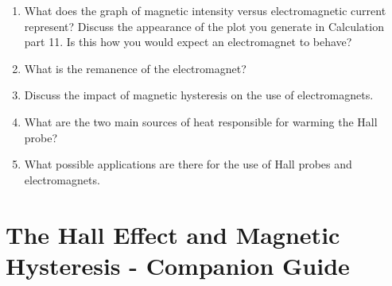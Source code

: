 \begin{enumerate}[resume]
\item What does the graph of magnetic intensity versus electromagnetic current represent? Discuss the appearance of the plot you generate in Calculation part 11. Is this how you would expect an electromagnet to behave?

\item What is the remanence of the electromagnet? 

\item Discuss the impact of magnetic hysteresis on the use of electromagnets.

\item What are the two main sources of heat responsible for warming the Hall probe? 

\item What possible applications are there for the use of Hall probes and electromagnets.

\end{enumerate}


\AtEndDocument{\clearpage\ifodd\value{page}\else\null\clearpage\fi} %

%
%


\chapter{The Hall Effect and Magnetic Hysteresis - Companion Guide}

